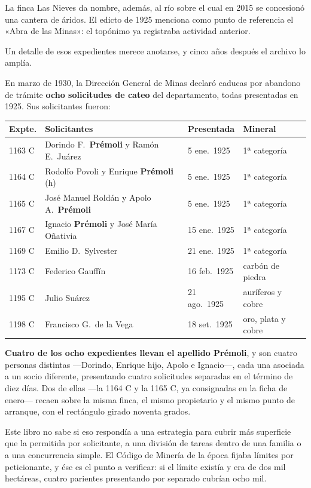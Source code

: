 La finca Las Nieves da nombre, además, al río sobre el cual en 2015 se concesionó una
cantera de áridos. El edicto de 1925 menciona como punto de referencia el «Abra de las
Minas»: el topónimo ya registraba actividad anterior.

\begin{cautela}
Un detalle de esos expedientes merece anotarse, y cinco años después el archivo lo amplía.

En marzo de 1930, la Dirección General de Minas declaró caducas por abandono de trámite
\textbf{ocho solicitudes de cateo} del departamento, todas presentadas en 1925. Sus
solicitantes fueron:

\begin{center}\small
\begin{tabular}{@{}llll@{}}
\toprule
\textbf{Expte.} & \textbf{Solicitantes} & \textbf{Presentada} & \textbf{Mineral} \\
\midrule
1163 C & Dorindo F.\ \textbf{Prémoli} y Ramón E.\ Juárez & 5 ene.\ 1925 & 1ª categoría \\
1164 C & Rodolfo Povoli y Enrique \textbf{Prémoli} (h) & 5 ene.\ 1925 & 1ª categoría \\
1165 C & José Manuel Roldán y Apolo A.\ \textbf{Prémoli} & 5 ene.\ 1925 & 1ª categoría \\
1167 C & Ignacio \textbf{Prémoli} y José María Oñativia & 15 ene.\ 1925 & 1ª categoría \\
1169 C & Emilio D.\ Sylvester & 21 ene.\ 1925 & 1ª categoría \\
1173 C & Federico Gauffín & 16 feb.\ 1925 & carbón de piedra \\
1195 C & Julio Suárez & 21 ago.\ 1925 & auríferos y cobre \\
1198 C & Francisco G.\ de la Vega & 18 set.\ 1925 & oro, plata y cobre \\
\bottomrule
\end{tabular}
\end{center}

\textbf{Cuatro de los ocho expedientes llevan el apellido Prémoli}, y son cuatro personas
distintas —Dorindo, Enrique hijo, Apolo e Ignacio—, cada una asociada a un socio diferente,
presentando cuatro solicitudes separadas en el término de diez días. Dos de ellas ---la 1164 C y la 1165 C, ya consignadas en la ficha de enero--- recaen sobre la misma finca, el mismo propietario y el mismo punto de arranque, con
el rectángulo girado noventa grados.

Este libro no sabe si eso respondía a una estrategia para cubrir más superficie que la
permitida por solicitante, a una división de tareas dentro de una familia o a una
concurrencia simple. El Código de Minería de la época fijaba límites por peticionante, y ése
es el punto a verificar: si el límite existía y era de dos mil hectáreas, cuatro parientes
presentando por separado cubrían ocho mil.


\end{cautela}
